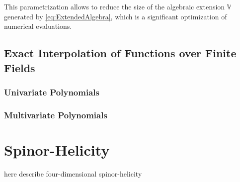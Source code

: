 This parametrization allows to reduce the size of the algebraic extension $\mathbb{V}$ generated by \cref{eq:ExtendedAlgebra},
which is a significant optimization of numerical evaluations.




\section{Exact Interpolation of Functions over Finite Fields}
\subsection{Univariate Polynomials}
\subsection{Multivariate Polynomials}




\chapter{Spinor-Helicity}
\label{chap:4dspinhel}

here describe four-dimensional spinor-helicity




